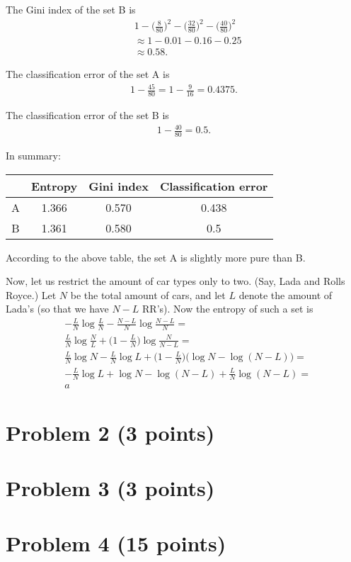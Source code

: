 \documentclass[10pt]{article}
\begin{document}
The Gini index of the set B is
\begin{align*}
&1 - \Bigg( \frac{8}{80} \Bigg)^2 - \Bigg( \frac{32}{80} \Bigg)^2 - \Bigg( \frac{40}{80} \Bigg)^2 \\
&\approx 1 - 0.01 - 0.16 - 0.25 \\
&\approx 0.58.
\end{align*}

The classification error of the set A is
\begin{align*}
1 - \frac{45}{80} = 1 - \frac{9}{16} = 0.4375.
\end{align*}

The classification error of the set B is
\begin{align*}
1 - \frac{40}{80} = 0.5.
\end{align*}

In summary:
\begin{table}[h]
\centering
\begin{tabular}[H]{|c||c|c|c|}
\hline
 & Entropy & Gini index & Classification error \\
 \hline
 A & 1.366 & 0.570 & 0.438 \\
 \hline
 B & 1.361 & 0.580 & 0.5 \\
 \hline
\end{tabular}
\end{table}
According to the above table, the set A is slightly more pure than B.

Now, let us restrict the amount of car types only to two. (Say, Lada and Rolls Royce.) Let $N$ be the total amount of cars, and let $L$ denote the amount of Lada's (so that we have $N - L$ RR's). Now the entropy of such a set is
\begin{align*}
& -\frac{L}{N} \log \frac{L}{N} - \frac{N - L}{N} \log \frac{N - L}{N} = \\
& \frac{L}{N}\log \frac{N}{L} + \Bigg( 1 - \frac{L}{N} \Bigg) \log \frac{N}{N - L} = \\
& \frac{L}{N} \log N - \frac{L}{N} \log L + \Bigg( 1 - \frac{L}{N} \Bigg) \Bigg( \log N - \log (N - L) \Bigg) = \\
& -\frac{L}{N} \log L + \log N - \log (N - L) + \frac{L}{N} \log(N - L) = \\
&a
\end{align*}

\color{blue}
\section*{Problem 2 (3 points)}

\color{blue}
\section*{Problem 3 (3 points)}

\color{blue}
\section*{Problem 4 (15 points)}
\end{document}
